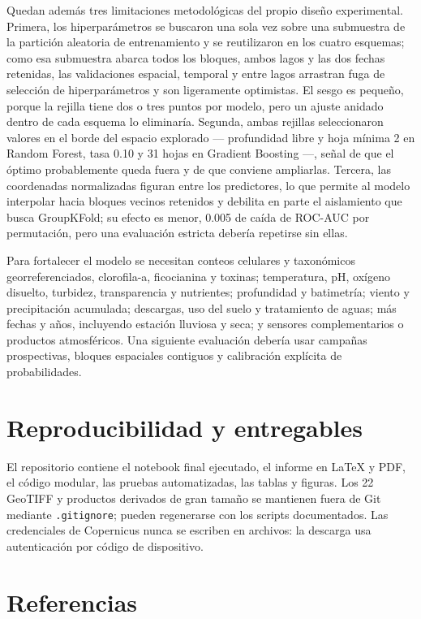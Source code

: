 \documentclass[11pt,letterpaper]{article}
\newcommand{\code}[1]{\texttt{#1}}
\begin{document}
Quedan además tres limitaciones metodológicas del propio diseño experimental. Primera, los hiperparámetros se buscaron una sola vez sobre una submuestra de la partición aleatoria de entrenamiento y se reutilizaron en los cuatro esquemas; como esa submuestra abarca todos los bloques, ambos lagos y las dos fechas retenidas, las validaciones espacial, temporal y entre lagos arrastran fuga de selección de hiperparámetros y son ligeramente optimistas. El sesgo es pequeño, porque la rejilla tiene dos o tres puntos por modelo, pero un ajuste anidado dentro de cada esquema lo eliminaría. Segunda, ambas rejillas seleccionaron valores en el borde del espacio explorado --- profundidad libre y hoja mínima 2 en Random Forest, tasa 0.10 y 31 hojas en Gradient Boosting ---, señal de que el óptimo probablemente queda fuera y de que conviene ampliarlas. Tercera, las coordenadas normalizadas figuran entre los predictores, lo que permite al modelo interpolar hacia bloques vecinos retenidos y debilita en parte el aislamiento que busca GroupKFold; su efecto es menor, 0.005 de caída de ROC-AUC por permutación, pero una evaluación estricta debería repetirse sin ellas.

Para fortalecer el modelo se necesitan conteos celulares y taxonómicos georreferenciados, clorofila-a, ficocianina y toxinas; temperatura, pH, oxígeno disuelto, turbidez, transparencia y nutrientes; profundidad y batimetría; viento y precipitación acumulada; descargas, uso del suelo y tratamiento de aguas; más fechas y años, incluyendo estación lluviosa y seca; y sensores complementarios o productos atmosféricos. Una siguiente evaluación debería usar campañas prospectivas, bloques espaciales contiguos y calibración explícita de probabilidades.

\section{Reproducibilidad y entregables}

El repositorio contiene el notebook final ejecutado, el informe en \LaTeX{} y PDF, el código modular, las pruebas automatizadas, las tablas y figuras. Los 22 GeoTIFF y productos derivados de gran tamaño se mantienen fuera de Git mediante \code{.gitignore}; pueden regenerarse con los scripts documentados. Las credenciales de Copernicus nunca se escriben en archivos: la descarga usa autenticación por código de dispositivo.

\section*{Referencias}
\end{document}

